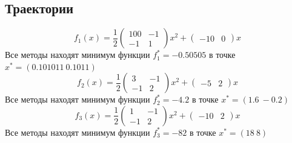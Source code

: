 \documentclass[english]{article}
\begin{document}
\subsection{Траектории}
\[ f_1(x) = \frac{1}{2}\begin{pmatrix}
  100 & -1 \\
  -1 & 1
\end{pmatrix} x^2 + \begin{pmatrix} -10 & 0 \end{pmatrix}x\]
Все методы находят минимум функции \(f_1^* = -0.50505\) в точке \(x^* = (0.101011\ 0.1011)\)
\[ f_2(x) = \frac{1}{2}\begin{pmatrix}
  3 & -1 \\
  -1 & 2
\end{pmatrix} x^2 + \begin{pmatrix} -5 & 2 \end{pmatrix}x\]
Все методы находят минимум функции \(f_2^* = -4.2\) в точке \(x^* = (1.6\ -0.2)\)
\[ f_3(x) = \frac{1}{2}\begin{pmatrix}
  1 & -1 \\
  -1 & 2
\end{pmatrix} x^2 + \begin{pmatrix} -10 & 2 \end{pmatrix}x\]
Все методы находят минимум функции \(f_3^* = -82\) в точке \(x^* = (18\ 8)\) \\
\end{document}
